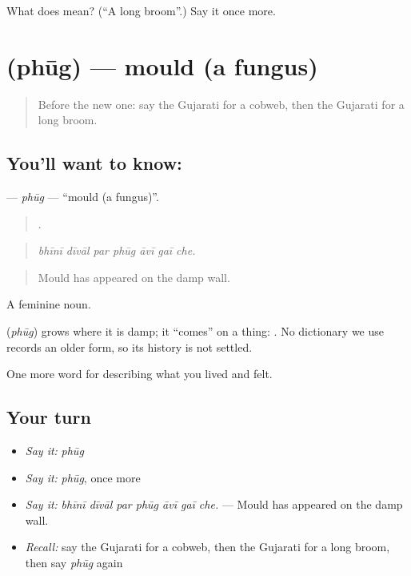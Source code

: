\begin{tcolorbox}[breakable,colback=teal!4,colframe=teal!35!black,title={Before you move on}]
What does  mean? (\textquotedblleft{}A long broom\textquotedblright{}.) Say it once more.
\end{tcolorbox}
\section[\texorpdfstring{\gu{ફૂગ} (phūg)}{ફૂગ (phūg)}]{ (phūg) — mould (a fungus)}

\label{lesson:GU-C518-phug}



\begin{quote}
Before the new one: say the Gujarati for a cobweb, then the Gujarati for a long broom.
\end{quote}

\subsection*{You'll want to know: }
\textbf{} — \emph{phūg} — \textquotedblleft{}mould (a fungus)\textquotedblright{}.

\begin{quote}
      .
\end{quote}

\begin{quote}
\emph{bhīnī dīvāl par phūg āvī gaī che.}
\end{quote}

\begin{quote}
Mould has appeared on the damp wall.
\end{quote}

A feminine noun.

\begin{cousinweb}
\textbf{} (\emph{phūg}) grows where it is damp; it \textquotedblleft{}comes\textquotedblright{} on a thing: \textbf{  }. No dictionary we use records an older form, so its history is not settled.
\end{cousinweb}

\begin{grammarlens}[title={What you've built}]
One more word for describing what you lived and felt.
\end{grammarlens}

\subsection*{Your turn}
\begin{itemize}
\raggedright
  \item \emph{Say it:} \emph{phūg}
  \item \emph{Say it:} \emph{phūg}, once more
  \item \emph{Say it:} \emph{bhīnī dīvāl par phūg āvī gaī che.} — Mould has appeared on the damp wall.
  \item \emph{Recall:} say the Gujarati for a cobweb, then the Gujarati for a long broom, then say \emph{phūg} again
\end{itemize}

